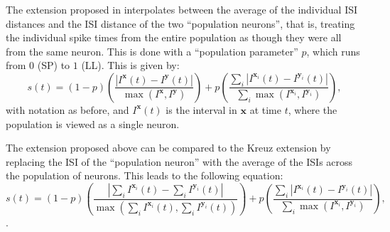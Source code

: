 The extension proposed in \cite{Kreuzetal2009} interpolates between the average of the individual ISI distances and the ISI distance of the two ``population neurons'', that is, treating the individual spike times from the entire population as though they were all from the same neuron.  This is done with a ``population parameter'' $p$, which runs from $0$ (SP) to $1$ (LL).  This is given by:
\begin{equation}
\label{pop}
s(t) = (1-p)\left( \frac{ | I^{\mathbf{x}}(t) - I^{\mathbf{y}}(t) |}{ \max (I^{\mathbf{x}},I^{\mathbf{y}})}\right) + p\left( \frac{\sum_i | I^{\mathbf{x}_i}(t) - I^{\mathbf{y}_i}(t) |}{\sum_i \max (I^{\mathbf{x}_i},I^{\mathbf{y}_i})} \right),
\end{equation}
with notation as before, and $I^{\mathbf{x}}(t)$ is the interval in $\mathbf{x}$ at time $t$, where the population is viewed as a single neuron.

%

The extension proposed above can be compared to the Kreuz extension by replacing the ISI of the ``population neuron'' with the average of the ISIs across the population of neurons.  This leads to the following equation: 
\begin{equation}
\label{av}
s(t) = (1-p) \left(\frac{ | \sum_i I^{\mathbf{x}_i}(t) - \sum_i I^{\mathbf{y}_i}(t) |}{\max (\sum_i I^{\mathbf{x}_i}(t),\sum_i I^{\mathbf{y}_i}(t) )}\right) + p\left( \frac{\sum_i | I^{\mathbf{x}_i}(t) - I^{\mathbf{y}_i}(t) |}{\sum_i \max (I^{\mathbf{x}_i},I^{\mathbf{y}_i})} \right),
\end{equation}.


%

